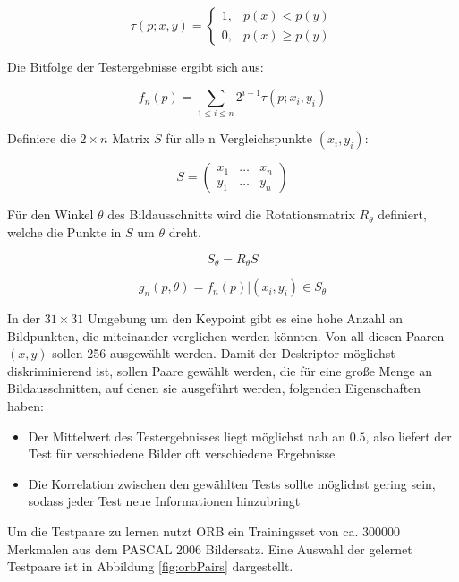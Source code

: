 \[
\tau(p; x, y) = 
\begin{cases}
1, & p(x) < p(y) \\
0, & p(x) \geq p(y)
\end{cases}
\]

Die Bitfolge der Testergebnisse ergibt sich aus:

\[
f_n(p) = \sum_{1 \leq i \leq n} 2^{i-1} \tau (p; x_i, y_i)
\]



Definiere die $2 \times n$ Matrix $S$ für alle n Vergleichspunkte $(x_i, y_i)$:

\[
S = \begin{pmatrix}
x_1 & \hdots & x_n \\
y_1 & \hdots & y_n 
\end{pmatrix}
\]

Für den Winkel $\theta$ des Bildausschnitts wird die Rotationsmatrix $R_\theta$ definiert, welche die Punkte in $S$ um $\theta$ dreht.

\[
S_\theta = R_\theta S
\]


\[
g_n(p, \theta) = f_n(p)|(x_i, y_i) \in S_\theta
\]


In der $31 \times 31$ Umgebung um den Keypoint gibt es eine hohe Anzahl an Bildpunkten, die miteinander verglichen werden könnten. Von all diesen Paaren $(x, y)$ sollen 256 ausgewählt werden.
Damit der Deskriptor möglichst diskriminierend ist, sollen Paare gewählt werden, die für eine große Menge an Bildausschnitten, auf denen sie ausgeführt werden, folgenden Eigenschaften haben:
\begin{itemize}

\item  Der Mittelwert des Testergebnisses liegt möglichst nah an $0.5$, also liefert der Test für verschiedene Bilder oft verschiedene Ergebnisse

\item Die Korrelation zwischen den gewählten Tests sollte möglichst gering sein, sodass jeder Test neue Informationen hinzubringt

\end{itemize}

Um die Testpaare zu lernen nutzt ORB ein Trainingsset von ca. 300000 Merkmalen aus dem PASCAL 2006 Bildersatz. Eine Auswahl der gelernet Testpaare ist in Abbildung \ref{fig:orbPairs} dargestellt.

